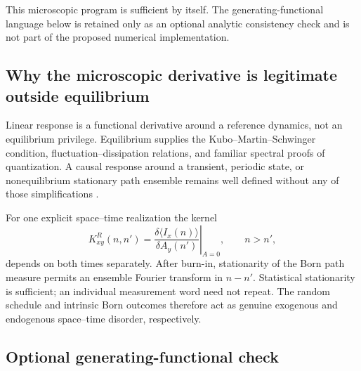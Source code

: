 \documentclass[aps,prb,onecolumn,nofootinbib,superscriptaddress]{revtex4-2}
\begin{document}
This microscopic program is sufficient by itself.  The generating-functional
language below is retained only as an optional analytic consistency check and
is not part of the proposed numerical implementation.

\subsection{Why the microscopic derivative is legitimate outside equilibrium}

Linear response is a functional derivative around a reference dynamics, not
an equilibrium privilege.  Equilibrium supplies the Kubo--Martin--Schwinger
condition, fluctuation--dissipation relations, and familiar spectral proofs of
quantization.  A causal response around a transient, periodic state, or
nonequilibrium stationary path ensemble remains well defined without any of
those simplifications
\cite{VenutiZanardi2016,KonopikLutz2019,TalkingtonClaassen2024}.

For one explicit space--time realization the kernel
\begin{equation}
  K^R_{xy}(n,n')
  =\left.
  \frac{\delta\langle I_x(n)\rangle}{\delta A_y(n')}
  \right|_{A=0},
  \qquad n>n',
  \label{eq:two-time-hall-kernel}
\end{equation}
depends on both times separately.  After burn-in, stationarity of the Born path
measure permits an ensemble Fourier transform in $n-n'$.  Statistical
stationarity is sufficient; an individual measurement word need not repeat.
The random schedule and intrinsic Born outcomes therefore act as genuine
exogenous and endogenous space--time disorder, respectively.

\subsection{Optional generating-functional check}
\end{document}
